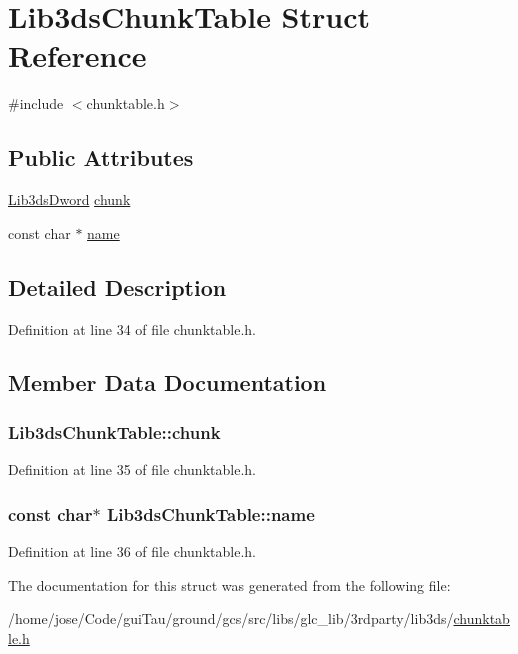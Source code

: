 \hypertarget{struct_lib3ds_chunk_table}{\section{Lib3ds\-Chunk\-Table Struct Reference}
\label{struct_lib3ds_chunk_table}
}


{\ttfamily \#include $<$chunktable.\-h$>$}

\subsection*{Public Attributes}
\begin{DoxyCompactItemize}
\item 
\hyperlink{types_8h_a299c9663303144c562f6bd92c2f273d3}{Lib3ds\-Dword} \hyperlink{struct_lib3ds_chunk_table_aa46f0d264af490f4f02d373b82582d08}{chunk}
\item 
const char $\ast$ \hyperlink{struct_lib3ds_chunk_table_aaf0fdbbc86d895ea3194ce61853c63a6}{name}
\end{DoxyCompactItemize}


\subsection{Detailed Description}


Definition at line 34 of file chunktable.\-h.



\subsection{Member Data Documentation}
\hypertarget{struct_lib3ds_chunk_table_aa46f0d264af490f4f02d373b82582d08}{
\subsubsection[{chunk}]{ Lib3ds\-Chunk\-Table\-::chunk}}\label{struct_lib3ds_chunk_table_aa46f0d264af490f4f02d373b82582d08}


Definition at line 35 of file chunktable.\-h.

\hypertarget{struct_lib3ds_chunk_table_aaf0fdbbc86d895ea3194ce61853c63a6}{
\subsubsection[{name}]{\setlength{\rightskip}{0pt plus 5cm}const char$\ast$ Lib3ds\-Chunk\-Table\-::name}}\label{struct_lib3ds_chunk_table_aaf0fdbbc86d895ea3194ce61853c63a6}


Definition at line 36 of file chunktable.\-h.



The documentation for this struct was generated from the following file\-:\begin{DoxyCompactItemize}
\item 
/home/jose/\-Code/gui\-Tau/ground/gcs/src/libs/glc\-\_\-lib/3rdparty/lib3ds/\hyperlink{chunktable_8h}{chunktable.\-h}\end{DoxyCompactItemize}
